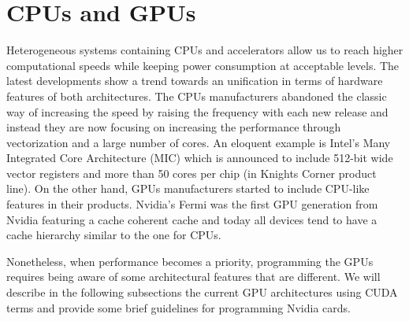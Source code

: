 \section{CPUs and GPUs}
\label{sec:cpus_vs_gpus}
Heterogeneous systems containing CPUs and accelerators allow us to reach higher
computational speeds while keeping power consumption at acceptable levels. The
latest developments show a trend towards an unification in terms of hardware
features of both architectures. The CPUs manufacturers abandoned the classic way
of increasing the speed by raising the frequency with each new release and
instead they are now focusing on increasing the performance through
vectorization and a large number of cores. An eloquent example is Intel's Many
Integrated Core Architecture (MIC) \cite{intel_mic} which is announced to
include 512-bit wide vector registers and more than 50 cores per chip (in
Knights Corner product line). On the other hand, GPUs manufacturers started to
include CPU-like features in their products. Nvidia's Fermi \cite{fermi} was
the first GPU generation from Nvidia featuring a cache coherent cache and today
all devices tend to have a cache hierarchy similar to the one for CPUs.

Nonetheless, when performance becomes a priority, programming the GPUs requires
being aware of some architectural features that are different. We will describe
in the following subsections the current GPU architectures using CUDA terms and
provide some brief guidelines for programming Nvidia cards.


